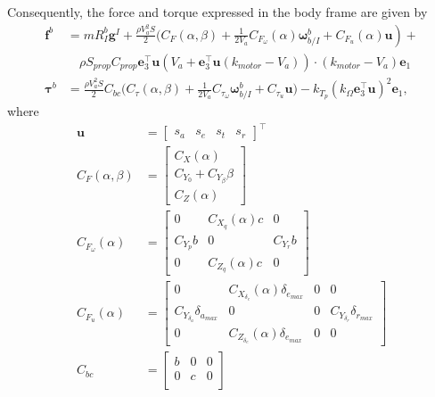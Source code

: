\documentclass{article}
\begin{document}
\begin{appendices}
Consequently, the force and torque expressed in the body frame are given by
\begin{align}
\mathbf{f}^{b} & =mR_{I}^{b}\mathbf{g}^{I}+\frac{\rho V_{a}^{2}S}{2}\bigg(C_{F}\left(\alpha,\beta\right)+\left.\frac{1}{2V_{a}}C_{F_{\omega}}\left(\alpha\right)\boldsymbol{\omega}_{b/I}^{b}+C_{F_{u}}\left(\alpha\right)\mathbf{u}\right)+\nonumber\\
&\quad\rho S_{prop}C_{prop}\mathbf{e}_{3}^{\top}\mathbf{u}\left(V_{a}+\mathbf{e}_{3}^{\top}\mathbf{u}\left(k_{motor}-V_{a}\right)\right)\cdot\nonumber\left(k_{motor}-V_{a}\right)\mathbf{e}_{1}\nonumber\\
\boldsymbol{\tau}^{b} & =\frac{\rho V_{a}^{2}S}{2}C_{bc}\bigg(C_{\tau}\left(\alpha,\beta\right)+\frac{1}{2V_{a}}C_{\tau_{\omega}}\boldsymbol{\omega}_{b/I}^{b}+ C_{\tau_{u}}\mathbf{u}\bigg)-k_{T_{p}}\left(k_{\Omega}\mathbf{e}_{3}^{\top}\mathbf{u}\right)^{2}\mathbf{e}_{1},\nonumber
\end{align}
where
\begin{align}
\mathbf{u} & =\begin{bmatrix}s_{a} & s_{e} & s_{t} & s_{r}\end{bmatrix}^{\top}\\
C_{F}\left(\alpha,\beta\right) & =\begin{bmatrix}C_{X}\left(\alpha\right)\\
C_{Y_{0}}+C_{Y_{\beta}}\beta\\
C_{Z}\left(\alpha\right)
\end{bmatrix}\\
C_{F_{\omega}}\left(\alpha\right) & =\begin{bmatrix}0 & C_{X_{q}}\left(\alpha\right)c & 0\\
C_{Y_{p}}b & 0 & C_{Y_{r}}b\\
0 & C_{Z_{q}}\left(\alpha\right)c & 0
\end{bmatrix}\\
C_{F_{u}}\left(\alpha\right) & =\begin{bmatrix}0 & C_{X_{\delta_{e}}}\left(\alpha\right)\delta_{e_{max}} & 0 & 0\\
C_{Y_{\delta_{a}}}\delta_{a_{max}} & 0 & 0 & C_{Y_{\delta_{r}}}\delta_{r_{max}}\\
0 & C_{Z_{\delta_{e}}}\left(\alpha\right)\delta_{e_{max}} & 0 & 0
\end{bmatrix}\\
C_{bc} & =\begin{bmatrix}b & 0 & 0\\
0 & c & 0\\

\end{bmatrix}
\end{align}
\end{appendices}
\end{document}
